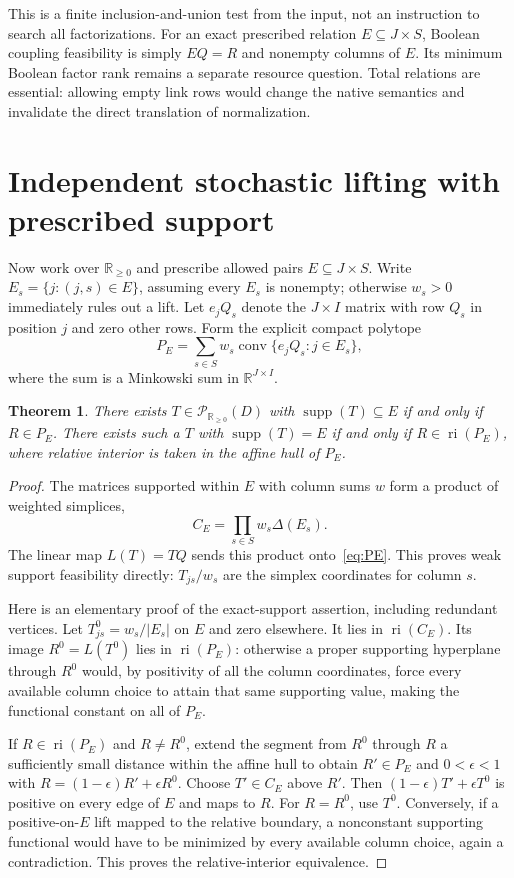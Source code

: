 \documentclass[11pt]{article}
\newcommand{\R}{\mathbb R}
\newcommand{\supp}{\operatorname{supp}}
\newcommand{\conv}{\operatorname{conv}}
\newcommand{\ri}{\operatorname{ri}}
\newcommand{\Pcal}{\mathcal P}
\newtheorem{theorem}{Theorem}[section]
\theoremstyle{remark}
\begin{document}
This is a finite inclusion-and-union test from the input, not an instruction to search all factorizations. For an exact prescribed relation $E\subseteq J\times S$, Boolean coupling feasibility is simply $EQ=R$ and nonempty columns of $E$. Its minimum Boolean factor rank remains a separate resource question. Total relations are essential: allowing empty link rows would change the native semantics and invalidate the direct translation of normalization.

\section{Independent stochastic lifting with prescribed support}\label{sec:convex}

Now work over $\R_{\ge0}$ and prescribe allowed pairs $E\subseteq J\times S$. Write $E_s=\{j:(j,s)\in E\}$, assuming every $E_s$ is nonempty; otherwise $w_s>0$ immediately rules out a lift. Let $e_jQ_s$ denote the $J\times I$ matrix with row $Q_s$ in position $j$ and zero other rows. Form the explicit compact polytope
\begin{equation}\label{eq:PE}
 P_E=\sum_{s\in S}w_s\conv\{e_jQ_s:j\in E_s\},
\end{equation}
where the sum is a Minkowski sum in $\R^{J\times I}$.

\begin{theorem}\label{thm:lift}
There exists $T\in\Pcal_{\R_{\ge0}}(D)$ with $\supp(T)\subseteq E$ if and only if $R\in P_E$. There exists such a $T$ with $\supp(T)=E$ if and only if $R\in\ri(P_E)$, where relative interior is taken in the affine hull of $P_E$.
\end{theorem}
\begin{proof}
The matrices supported within $E$ with column sums $w$ form a product of weighted simplices,
\[
 C_E=\prod_{s\in S}w_s\Delta(E_s).
\]
The linear map $L(T)=TQ$ sends this product onto~\eqref{eq:PE}. This proves weak support feasibility directly: $T_{js}/w_s$ are the simplex coordinates for column $s$.

Here is an elementary proof of the exact-support assertion, including redundant vertices. Let $T^0_{js}=w_s/|E_s|$ on $E$ and zero elsewhere. It lies in $\ri(C_E)$. Its image $R^0=L(T^0)$ lies in $\ri(P_E)$: otherwise a proper supporting hyperplane through $R^0$ would, by positivity of all the column coordinates, force every available column choice to attain that same supporting value, making the functional constant on all of $P_E$.

If $R\in\ri(P_E)$ and $R\ne R^0$, extend the segment from $R^0$ through $R$ a sufficiently small distance within the affine hull to obtain $R'\in P_E$ and $0<\epsilon<1$ with $R=(1-\epsilon)R'+\epsilon R^0$. Choose $T'\in C_E$ above $R'$. Then $(1-\epsilon)T'+\epsilon T^0$ is positive on every edge of $E$ and maps to $R$. For $R=R^0$, use $T^0$. Conversely, if a positive-on-$E$ lift mapped to the relative boundary, a nonconstant supporting functional would have to be minimized by every available column choice, again a contradiction. This proves the relative-interior equivalence.
\end{proof}
\end{document}
